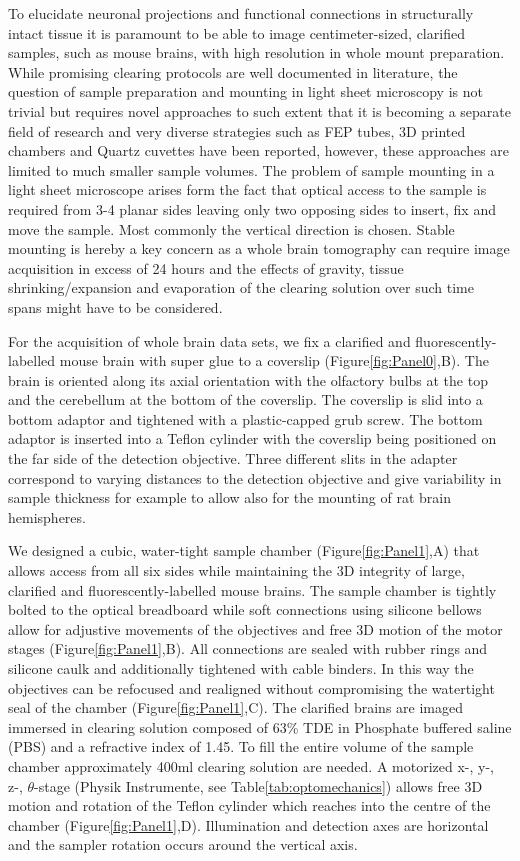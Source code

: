 \documentclass[12pt]{spieman}  %
\begin{document}
To elucidate neuronal projections and functional connections in structurally intact tissue it is paramount to be able to image centimeter-sized, clarified samples, such as mouse brains, with high resolution in whole mount preparation. While promising clearing protocols are well documented in literature\cite{Chung2013,Tomer2014}, the question of sample preparation and mounting in light sheet microscopy is not trivial but requires novel approaches to such extent that it is becoming a separate field of research and very diverse strategies such as FEP tubes, 3D printed chambers and Quartz cuvettes have been reported\cite{Kaufmann2012,Pitrone2013,Olarte2012,Tomer2014}, however, these approaches are limited to much smaller sample volumes. The problem of sample mounting in a light sheet microscope arises form the fact that optical access to the sample is required from 3-4 planar sides leaving only two opposing sides to insert, fix and move the sample. Most commonly the vertical direction is chosen. Stable mounting is hereby a key concern as a whole brain tomography can require image acquisition in excess of 24 hours and the effects of gravity, tissue shrinking/expansion and evaporation of the clearing solution over such time spans might have to be considered. 

For the acquisition of whole brain data sets, we fix a clarified and fluorescently-labelled mouse brain with super glue to a coverslip (Figure\ref{fig:Panel0},B). The brain is oriented along its axial orientation with the olfactory bulbs at the top and the cerebellum at the bottom of the coverslip. The coverslip is slid into a bottom adaptor and tightened with a plastic-capped grub screw. The bottom adaptor is inserted into a Teflon cylinder with the coverslip being positioned on the far side of the detection objective. Three different slits in the adapter correspond to varying distances to the detection objective and give variability in sample thickness for example to allow also for the mounting of rat brain hemispheres.
	
We designed a cubic, water-tight sample chamber (Figure\ref{fig:Panel1},A) that allows access from all six sides while maintaining the 3D integrity of large, clarified and fluorescently-labelled mouse brains. The sample chamber is tightly bolted  to the optical breadboard while soft connections using silicone bellows allow for adjustive movements of the objectives and free 3D motion of the motor stages (Figure\ref{fig:Panel1},B). All connections are sealed with rubber rings and silicone caulk and additionally tightened with cable binders. In this way the objectives can be refocused and realigned without compromising the watertight seal of the chamber (Figure\ref{fig:Panel1},C). The clarified brains are imaged immersed in clearing solution composed of 63\% TDE in Phosphate buffered saline (PBS) and a refractive index of 1.45. To fill the entire volume of the sample chamber approximately 400ml clearing solution are needed. A motorized x-, y-, z-, $\theta$-stage (Physik Instrumente, see Table\ref{tab:optomechanics}) allows free 3D motion and rotation of the Teflon cylinder which reaches into the centre of the chamber (Figure\ref{fig:Panel1},D). Illumination and detection axes are horizontal and the sampler rotation occurs around the vertical axis.		
		
\end{document}

